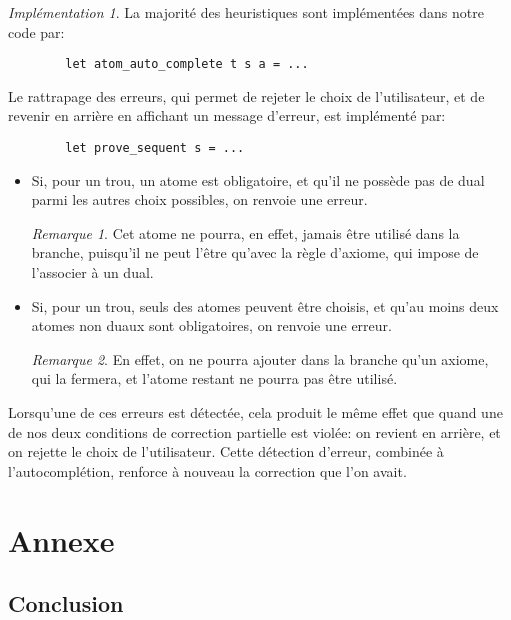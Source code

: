 \documentclass[11pt,a4paper]{article}
\theoremstyle{plain}
\theoremstyle{definition}
\theoremstyle{remark}
\newtheorem{remark}{Remarque}
\newtheorem{implementation}{Implémentation}
\begin{document}
\begin{implementation}
    La majorité des heuristiques sont implémentées dans notre code par:

    \begin{verbatim}
        let atom_auto_complete t s a = ...
    \end{verbatim}
    
    Le rattrapage des erreurs, qui permet de rejeter le choix de l'utilisateur, et de revenir en arrière en affichant un message d'erreur, est implémenté par:

    \begin{verbatim}
        let prove_sequent s = ...
    \end{verbatim}
\end{implementation}

\begin{itemize}
    \item Si, pour un trou, un atome est obligatoire, et qu'il ne possède pas de dual parmi les autres choix possibles, on renvoie une erreur.

    \begin{remark}
        Cet atome ne pourra, en effet, jamais être utilisé dans la branche, puisqu'il ne peut l'être qu'avec la règle d'axiome, qui impose de l'associer à un dual.
    \end{remark}

    \item Si, pour un trou, seuls des atomes peuvent être choisis, et qu'au moins deux atomes non duaux sont obligatoires, on renvoie une erreur.

    \begin{remark}
        En effet, on ne pourra ajouter dans la branche qu'un axiome, qui la fermera, et l'atome restant ne pourra pas être utilisé.
    \end{remark}
\end{itemize}

Lorsqu'une de ces erreurs est détectée, cela produit le même effet que quand une de nos deux conditions de correction partielle est violée: on revient en arrière, et on rejette le choix de l'utilisateur. Cette détection d'erreur, combinée à l'autocomplétion, renforce à nouveau la correction que l'on avait.

\section{Annexe}

\subsection{Conclusion}
\end{document}
